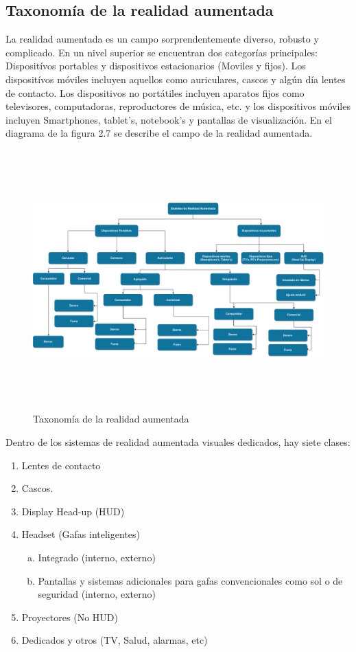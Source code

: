 \subsection{Taxonomía de la realidad aumentada}
La realidad aumentada es un campo sorprendentemente diverso, robusto y complicado. En un nivel superior se encuentran dos categorías principales: Dispositívos portables y dispositivos estacionarios (Moviles y fijos).
Los dispositívos móviles incluyen aquellos como auriculares, cascos y algún día lentes de contacto. Los dispositivos no portátiles incluyen aparatos fijos como televisores, computadoras, reproductores de música, etc. y los dispositivos móviles incluyen Smartphones, tablet's, notebook's y pantallas de visualización. En el diagrama de la figura 2.7 se describe el campo de la realidad aumentada\cite{B22}. \par
\vspace{5mm}
\begin{figure}[h!]
	\centering
	\includegraphics[width=17cm,height=10cm]{imagenes/marcoteorico/ar/taxonomiaAR.png}
	\caption{Taxonomía de la realidad aumentada\cite{B22}}
	\label{fig:analogo}
\end{figure}

Dentro de los sistemas de realidad aumentada visuales dedicados, hay siete clases:\cite{B22} \par
\vspace{5mm}
\begin{enumerate}[1.]
	\item Lentes de contacto
	\item Cascos.
	\item Display Head-up (HUD)
	\item Headset (Gafas inteligentes)
	\begin{enumerate}[a)]
		\item Integrado (interno, externo)
		\item Pantallas y sistemas adicionales para gafas convencionales como sol o de seguridad (interno, externo)
	\end{enumerate}
	\item Proyectores (No HUD)
	\item Dedicados y otros (TV, Salud, alarmas, etc)

\end{enumerate}

